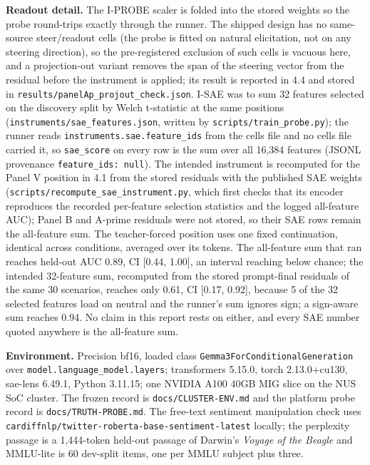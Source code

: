 \documentclass[11pt,a4paper]{article}
\newcommand{\pnum}[2]{#2}
\begin{document}
\textbf{Readout detail.} The I-PROBE scaler is folded into the stored weights so the probe round-trips exactly through the runner. The shipped design has no same-source steer/readout cells (the probe is fitted on natural elicitation, not on any steering direction), so the pre-registered exclusion of such cells is vacuous here, and a projection-out variant removes the span of the steering vector from the residual before the instrument is applied; its result is reported in 4.4 and stored in \texttt{results/\allowbreak{}panelAp\_\allowbreak{}projout\_\allowbreak{}check.json}. I-SAE was to sum 32 features selected on the discovery split by Welch t-statistic at the same positions (\texttt{instruments/sae\_features.json}, written by \texttt{scripts/train\_probe.py}); the runner reads \texttt{instruments.sae.feature\_ids} from the cells file and no cells file carried it, so \texttt{sae\_score} on every row is the sum over all 16,384 features (JSONL provenance \texttt{feature\_ids: null}). The intended instrument is recomputed for the Panel V position in 4.1 from the stored residuals with the published SAE weights (\texttt{scripts/recompute\_sae\_instrument.py}, which first checks that its encoder reproduces the recorded per-feature selection statistics and the logged all-feature AUC); Panel B and A-prime residuals were not stored, so their SAE rows remain the all-feature sum. The teacher-forced position uses one fixed continuation, identical across conditions, averaged over its tokens. The all-feature sum that ran reaches held-out AUC \pnum{validity\_auc\_sae\_heldout}{0.89}, CI [0.44, 1.00], an interval reaching below chance; the intended 32-feature sum, recomputed from the stored prompt-final residuals of the same 30 scenarios, reaches only \pnum{validity\_auc\_sae\_recomputed}{0.61}, CI [0.17, 0.92], because 5 of the 32 selected features load on neutral and the runner's sum ignores sign; a sign-aware sum reaches 0.94. No claim in this report rests on either, and every SAE number quoted anywhere is the all-feature sum.

\textbf{Environment.} Precision bf16, loaded class \texttt{Gemma3ForConditionalGeneration} over \texttt{model.\allowbreak{}language\_\allowbreak{}model.\allowbreak{}layers}; transformers 5.15.0, torch 2.13.0+cu130, sae-lens 6.49.1, Python 3.11.15; one NVIDIA A100 40GB MIG slice on the NUS SoC cluster. The frozen record is \texttt{docs/\allowbreak{}CLUSTER-ENV.md} and the platform probe record is \texttt{docs/\allowbreak{}TRUTH-PROBE.md}. The free-text sentiment manipulation check uses \texttt{cardiffnlp/\allowbreak{}twitter-\allowbreak{}roberta-\allowbreak{}base-\allowbreak{}sentiment-\allowbreak{}latest} locally; the perplexity passage is a 1{,}444-token held-out passage of Darwin's \emph{Voyage of the Beagle} and MMLU-lite is 60 dev-split items, one per MMLU subject plus three.
\end{document}
